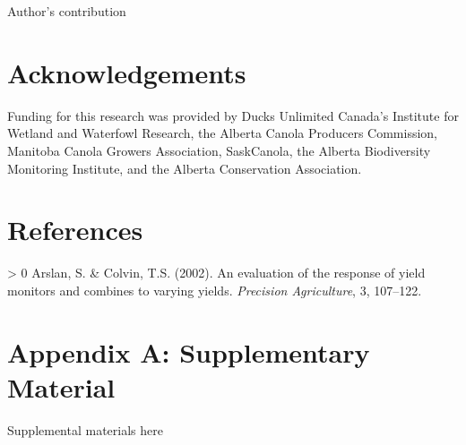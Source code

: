 \documentclass[]{elsarticle} %
\newlength{\cslhangindent}
\newenvironment{CSLReferences}[3] %
 {%
  \setlength{\parindent}{0pt}
  \ifodd #1 \everypar{\setlength{\hangindent}{\cslhangindent}}\ignorespaces\fi
  \ifnum #2 > 0
  \setlength{\parskip}{#2\baselineskip}
  \fi
 }%
 {}
\begin{document}
Author's contribution

\hypertarget{acknowledgements}{%
\section{Acknowledgements}\label{acknowledgements}}

Funding for this research was provided by Ducks Unlimited Canada's Institute for Wetland and Waterfowl Research, the Alberta Canola Producers Commission, Manitoba Canola Growers Association, SaskCanola, the Alberta Biodiversity Monitoring Institute, and the Alberta Conservation Association.

\hypertarget{references}{%
\section*{References}\label{references}}

\hypertarget{refs}{}
\begin{CSLReferences}{1}{0}
\leavevmode\hypertarget{ref-arslan2002}{}%
Arslan, S. \& Colvin, T.S. (2002). An evaluation of the response of yield monitors and combines to varying yields. \emph{Precision Agriculture}, 3, 107--122.

\end{CSLReferences}

\newpage

\hypertarget{appendix-a-supplementary-material}{%
\section*{Appendix A: Supplementary Material}\label{appendix-a-supplementary-material}}

Supplemental materials here
\end{document}
